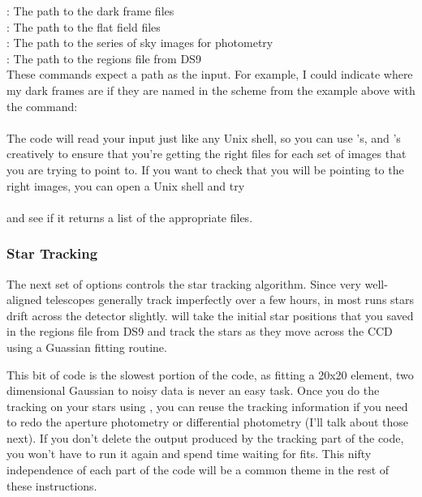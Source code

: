 \documentclass{article}
\begin{document}
\indent {}: The path to the dark frame files		\\
\indent {}: The path to the flat field files	\\
\indent {}: The path to the series of sky images for photometry	\\
\indent {}: The path to the regions file from DS9 	\\

These commands expect a path as the input. For example, I could indicate where my dark frames are if they are named in the scheme from the example above with the command: \\

\indent {}\\

The code will read your input just like any Unix shell, so you can use \code{*}'s, and 's creatively to ensure that you're getting the right files for each set of images that you are trying to point to.  If you want to check that you will be pointing to the right images, you can open a Unix shell and try \\

\\

\noindent and see if it returns a list of the appropriate files. 

\subsubsection{Star Tracking}

The next set of options controls the star tracking algorithm. Since very well-aligned telescopes generally track imperfectly over a few hours, in most runs stars drift across the detector slightly. \oscaar  will take the initial star positions that you saved in the regions file from DS9 and track the stars as they move across the CCD using a Guassian fitting routine. 

	This bit of code is the slowest portion of the code, as fitting a 20x20 element, two dimensional Gaussian to noisy data is never an easy task. Once you do the tracking on your stars using \oscaar, you can reuse the tracking information if you need to redo the aperture photometry or differential photometry (I'll talk about those next). If you don't delete the output produced by the tracking part of the code, you won't have to run it again and spend time waiting for fits. This nifty independence of each part of the code will be a common theme in the rest of these instructions. 
\end{document}

